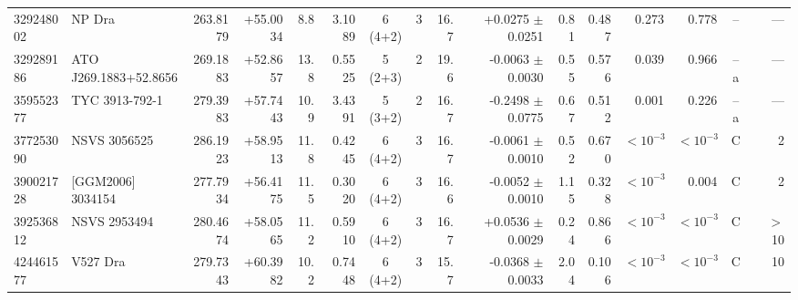 \documentclass{aa}
\begin{document}
\begin{table}
\begin{tabular}{l l r r r r c c r r r r r r c r}
329248002 & NP Dra & 263.8179 & +55.0034 & 8.8 & 3.1089 & 6 (4+2) & 3 & 16.7 & +0.0275 $\pm$ 0.0251 & 0.81 & 0.487 & 0.273 & 0.778 & -- & ---\\
329289186 & ATO J269.1883+52.8656 & 269.1883 & +52.8657 & 13.8 & 0.5525 & 5 (2+3) & 2 & 19.6 & -0.0063 $\pm$ 0.0030 & 0.55 & 0.576 & 0.039 & 0.966 & --a & ---\\
359552377 & TYC 3913-792-1 & 279.3983 & +57.7443 & 10.9 & 3.4391 & 5 (3+2) & 2 & 16.7 & -0.2498 $\pm$ 0.0775 & 0.67 & 0.512 & 0.001 & 0.226 & --a & ---\\
377253090 & NSVS 3056525 & 286.1923 & +58.9513 & 11.8 & 0.4245 & 6 (4+2) & 3 & 16.7 & -0.0061 $\pm$ 0.0010 & 0.52 & 0.670 & $<10^{-3}$ & $<10^{-3}$ & C & 2\\
390021728 & [GGM2006] 3034154 & 277.7934 & +56.4175 & 11.5 & 0.3020 & 6 (4+2) & 3 & 16.6 & -0.0052 $\pm$ 0.0010 & 1.15 & 0.328 & $<10^{-3}$ & 0.004 & C & 2\\
392536812 & NSVS 2953494 & 280.4674 & +58.0565 & 11.2 & 0.5910 & 6 (4+2) & 3 & 16.7 & +0.0536 $\pm$ 0.0029 & 0.24 & 0.866 & $<10^{-3}$ & $<10^{-3}$ & C & $>$ 10\\
424461577 & V527 Dra & 279.7343 & +60.3982 & 10.2 & 0.7448 & 6 (4+2) & 3 & 15.7 & -0.0368 $\pm$ 0.0033 & 2.04 & 0.106 & $<10^{-3}$ & $<10^{-3}$ & C & 10\\
\hline
\end{tabular}
\end{table}
\end{document}
